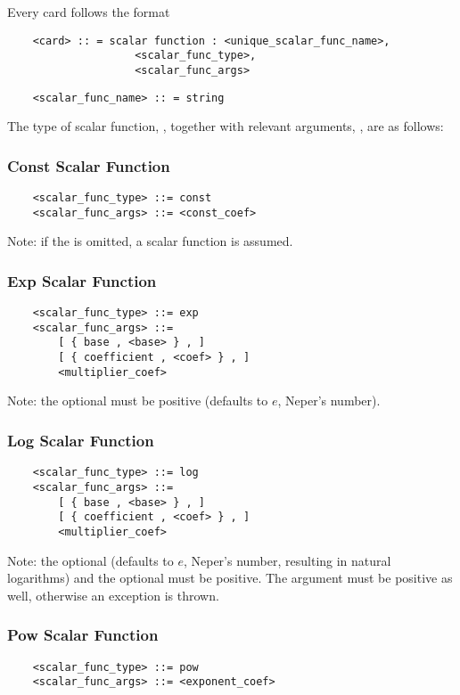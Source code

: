 \noindent
Every  card follows the format
\begin{verbatim}
    <card> :: = scalar function : <unique_scalar_func_name>, 
                    <scalar_func_type>,
                    <scalar_func_args>
\end{verbatim}
\begin{verbatim}
    <scalar_func_name> :: = string 
\end{verbatim}

\noindent
The type of scalar function,
, together 
with relevant arguments, ,
are as follows:
\subsubsection{Const Scalar Function}
\begin{verbatim}
    <scalar_func_type> ::= const
    <scalar_func_args> ::= <const_coef>
\end{verbatim}
Note: if the  is omitted,
a  scalar function is assumed.

\subsubsection{Exp Scalar Function}
\begin{verbatim}
    <scalar_func_type> ::= exp
    <scalar_func_args> ::=
        [ { base , <base> } , ]
        [ { coefficient , <coef> } , ]
        <multiplier_coef>
\end{verbatim}
Note: the optional  must be positive (defaults to $e$, Neper's number).

\subsubsection{Log Scalar Function}
\begin{verbatim}
    <scalar_func_type> ::= log
    <scalar_func_args> ::=
        [ { base , <base> } , ]
        [ { coefficient , <coef> } , ]
        <multiplier_coef>
\end{verbatim}
Note: the optional  (defaults to $e$, Neper's number,
resulting in natural logarithms)
and the optional 
must be positive.
The argument must be positive as well, otherwise an exception is thrown.

\subsubsection{Pow Scalar Function}
\begin{verbatim}
    <scalar_func_type> ::= pow
    <scalar_func_args> ::= <exponent_coef>
\end{verbatim}

